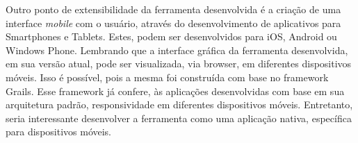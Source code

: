 Outro ponto de extensibilidade da ferramenta desenvolvida é a criação de uma interface \textit{mobile} com o usuário, através do desenvolvimento de aplicativos para Smartphones e Tablets. Estes, podem ser desenvolvidos para iOS, Android ou Windows Phone. Lembrando que a interface gráfica da ferramenta desenvolvida, em sua versão atual, pode ser visualizada, via browser, em diferentes dispositivos móveis. Isso é possível, pois a mesma foi construída com base no framework Grails. Esse framework já confere, às aplicações desenvolvidas com base em sua arquitetura padrão, responsividade em diferentes dispositivos móveis. Entretanto, seria interessante desenvolver a ferramenta como uma aplicação nativa, específica para dispositivos móveis.

